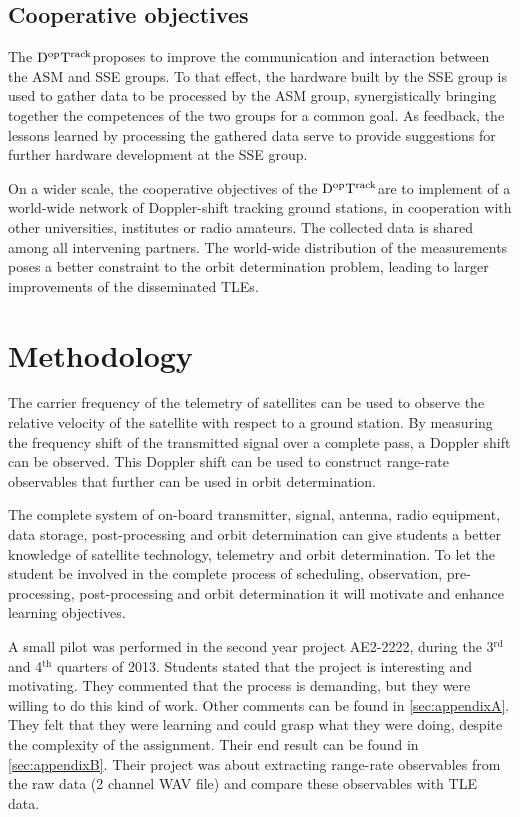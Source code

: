 \documentclass[11pt,a4paper,oneside]{article}
\newcommand{\GroundStationName}{${\rm D^{\rm op}T^{\rm rack}}$}
\newcommand{\superscript}[1]{\ensuremath{^{\textrm{#1}}}}
\begin{document}
\subsection{Cooperative objectives}

The \GroundStationName proposes to improve the communication and interaction between the \ac{ASM} and \ac{SSE} groups. To that effect, the hardware built by the \ac{SSE} group is used to gather data to be processed by the \ac{ASM} group, synergistically bringing together the competences of the two groups for a common goal. As feedback, the lessons learned by processing the gathered data serve to provide suggestions for further hardware development at the \ac{SSE} group.

On a wider scale, the cooperative objectives of the \GroundStationName are to implement of a world-wide network of Doppler-shift tracking ground stations, in cooperation with other universities, institutes or radio amateurs. The collected data is shared among all intervening partners. The world-wide distribution of the measurements poses a better constraint to the orbit determination problem, leading to larger improvements of the disseminated \acp{TLE}.



\section{Methodology}

The carrier frequency of the telemetry of satellites can be used to observe the relative velocity of the satellite with respect to a ground station. By measuring the frequency shift of the transmitted signal over a complete pass, a Doppler shift can be observed. This Doppler shift can be used to construct range-rate observables that further can be used in orbit determination.

The complete system of on-board transmitter, signal, antenna, radio equipment, data storage, post-processing and orbit determination can give students a better knowledge of satellite technology, telemetry and orbit determination. To let the student be involved in the complete process of scheduling, observation, pre-processing, post-processing and orbit determination it will motivate and enhance learning objectives.

A small pilot was performed in the second year project AE2-2222, during the 3\superscript{rd} and 4\superscript{th} quarters of 2013. Students stated that the project is interesting and motivating. They commented that the process is demanding, but they were willing to do this kind of work. Other comments can be found in \ref{sec:appendixA}. They felt that they were learning and could grasp what they were doing, despite the complexity of the assignment. Their end result can be found in \ref{sec:appendixB}. Their project was about extracting range-rate observables from the raw data (2 channel \ac{WAV} file) and compare these observables with \ac{TLE} data.
\end{document}
